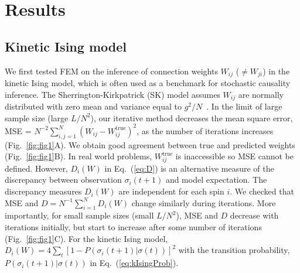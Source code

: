 \documentclass[prx,twocolumn,twoside,showpacs,superscriptaddress]{revtex4-1}
\begin{document}
\section{Results}
\subsection{Kinetic Ising model}
We first tested FEM on the inference of connection weights $W_{ij}$ ($\neq W_{ji}$) in the kinetic Ising model, which is often used as a benchmark for stochastic causality inference.
The Sherrington-Kirkpatrick (SK) model assumes $W_{ij}$ are normally distributed with zero mean and variance equal to $g^2/N$~\cite{Sherrington1975}.
In the limit of large sample size (large $L/N^2$), our iterative method decreases the mean square error, 
MSE = $N^{-2} \sum_{i,j=1}^N (W_{ij} - W_{ij}^{\textrm{true}})^2$, as the number of iterations increases (Fig.~\ref{fig:fig1}A).
We obtain good agreement between true and predicted weights (Fig.~\ref{fig:fig1}B).
In real world problems, $W_{ij}^{\textrm{true}}$ is inaccessible so MSE cannot be defined.
However, $D_i(W)$ in Eq.~(\ref{eq:D}) is an alternative measure of the discrepancy between observation $\sigma_i(t+1)$ and model expectation.
The discrepancy measures $D_i(W)$ are independent for each spin $i.$ 
We checked that MSE and $D=N^{-1}\sum_{i=1}^N D_i(W)$ change similarly during iterations.
More importantly, for small sample sizes (small $L/N^2$), MSE and $D$ decrease  with iterations initially, 
but start to increase after some number of iterations (Fig.~\ref{fig:fig1}C). 
For the kinetic Ising model, $D_i(W)=4\sum_{t} [1-P(\sigma_i(t+1)|\sigma(t))]^2$ 
with the transition probability, $P(\sigma_i(t+1)|\sigma(t))$ in Eq.~(\ref{eq:kIsingProb}).
\end{document}
